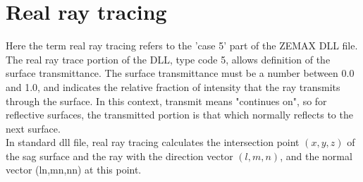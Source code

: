 \documentclass[../main.tex]{subfiles}
\begin{document}
	\section{Real ray tracing}
	Here the term real ray tracing refers to the 'case 5' part of the ZEMAX DLL file.\\
	The real ray trace portion of the DLL, type code 5, allows definition of the surface transmittance. The surface transmittance must be a number between 0.0 and 1.0, and indicates the relative fraction of intensity that the ray transmits through the surface. In this context, transmit means "continues on", so for reflective surfaces, the transmitted portion is that which normally reflects to the next surface.\\
	In standard dll file, real ray tracing calculates the intersection point $(x,y,z)$ of the sag surface and the ray with the direction vector $(l,m,n)$, and the normal vector (ln,mn,nn) at this point.\\
\end{document}
